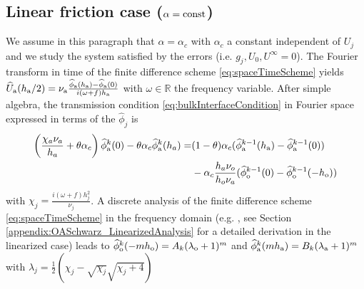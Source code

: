 \subsection{Linear friction case ($\alpha = {\rm const}$)}
%
%
We assume in this paragraph that $\alpha=\alpha_{c}$ with $\alpha_{c}$ 
a constant independent of $U_j$ and we study the system satisfied by the errors
(i.e. $g_j, U_0, U^\infty =0$). 
The Fourier transform in time of the finite difference scheme \eqref{eq:spaceTimeScheme} 
yields  
$\widehat{U}_{\rm a}(h_{\rm a}/2) = \nu_{\rm a} \frac{\widehat{\phi}_{\rm a}(h_{\rm a}) - \widehat{\phi}_{\rm a}(0)}{i(\omega+f) h_{\rm a}}$
with $\omega \in \mathbb{R}$ the frequency variable. 
After simple algebra, the transmission condition 
\eqref{eq:bulkInterfaceCondition} in Fourier space expressed 
in terms of the $\widehat{\phi}_j$ is 
\begin{equation} \label{eq:discreteBulkFourier}
\begin{aligned}
 \left( \frac{\chi_a\nu_a}{h_a}+\theta \alpha_c \right) \widehat{\phi}^k_{\rm a}(0) - \theta \alpha_c
\widehat{\phi}^k_{\rm a}(h_a) = &(1-\theta) \alpha_c 
(\widehat{\phi}^{k-1}_{\rm a}(h_{\rm a}) - \widehat{\phi}^{k-1}_{\rm a}(0)) \\
&- \alpha_c \frac{h_a \nu_o}{h_o \nu_a} (\widehat{\phi}^{k-1}_{\rm o}(0) - \widehat{\phi}^{k-1}_{\rm o}(-h_{\rm o}))
\end{aligned}
\end{equation}
with $\chi_j=\frac{i (\omega+f) h_j^2}{\nu_j}$.
A discrete analysis of the finite difference scheme \eqref{eq:spaceTimeScheme} in the
frequency domain (e.g. \cite{wu_optimized_2017}, see Section
\ref{appendix:OASchwarz_LinearizedAnalysis} for a detailed
derivation in the linearized case) leads to 
$\widehat{\phi}_{\rm o}^k(-m h_{\rm o}) = A_k (\lambda_{\rm o}+1)^m$
and
$\widehat{\phi}_{\rm a}^k(m h_{\rm a}) = B_k (\lambda_{\rm a}+1)^m$ 
with $\lambda_j = \frac{1}{2}\left(\chi_j - \sqrt{\chi_j} \sqrt{\chi_j + 4}\right)$ 
